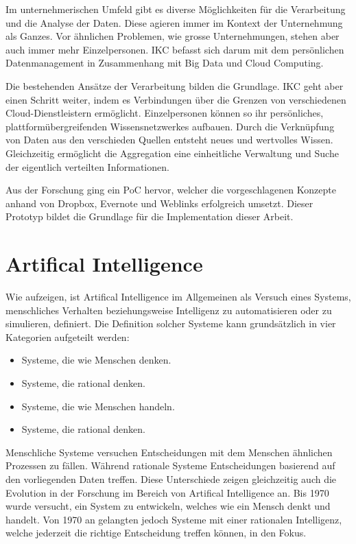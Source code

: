 Im unternehmerischen Umfeld gibt es diverse Möglichkeiten für die Verarbeitung und die Analyse der Daten. Diese agieren immer im Kontext der Unternehmung als Ganzes. Vor ähnlichen Problemen, wie grosse Unternehmungen, stehen aber auch immer mehr Einzelpersonen. IKC befasst sich darum mit dem persönlichen Datenmanagement in Zusammenhang mit Big Data und Cloud Computing.

Die bestehenden Ansätze der Verarbeitung bilden die Grundlage. IKC geht aber einen Schritt weiter, indem es Verbindungen über die Grenzen von verschiedenen Cloud-Dienstleistern ermöglicht. Einzelpersonen können so ihr persönliches, plattformübergreifenden Wis\-sens\-netz\-werkes aufbauen. Durch die Verknüpfung von Daten aus den verschieden Quellen entsteht neues und wertvolles Wissen. Gleichzeitig ermöglicht die Aggregation eine einheitliche Verwaltung und Suche der eigentlich verteilten Informationen.

Aus der Forschung ging ein \gls{PoC} hervor, welcher die vorgeschlagenen Konzepte anhand von Dropbox, Evernote und Weblinks erfolgreich umsetzt. Dieser Prototyp bildet die Grundlage für die Implementation dieser Arbeit.




\section{Artifical Intelligence}


Wie \cite{Russell:2009:AIM:1671238} aufzeigen, ist \gls{Artifical Intelligence} im Allgemeinen als Versuch eines Systems, menschliches Verhalten beziehungsweise Intelligenz zu automatisieren oder zu simulieren, definiert. Die Definition solcher Systeme kann grundsätzlich in vier Kategorien aufgeteilt werden: 

\begin{itemize}
    \item Systeme, die wie Menschen denken.
    \item Systeme, die rational denken.
    \item Systeme, die wie Menschen handeln.
    \item Systeme, die rational denken.
\end{itemize}

Menschliche Systeme versuchen Entscheidungen mit dem Menschen ähnlichen Prozessen zu fällen. Während rationale Systeme Entscheidungen basierend auf den vorliegenden Daten treffen. Diese Unterschiede zeigen gleichzeitig auch die Evolution in der Forschung im Bereich von \gls{Artifical Intelligence} an. Bis 1970 wurde versucht, ein System zu entwickeln, welches wie ein Mensch denkt und handelt. Von 1970 an gelangten jedoch Systeme mit einer rationalen Intelligenz, welche jederzeit die richtige Entscheidung treffen können, in den Fokus.


